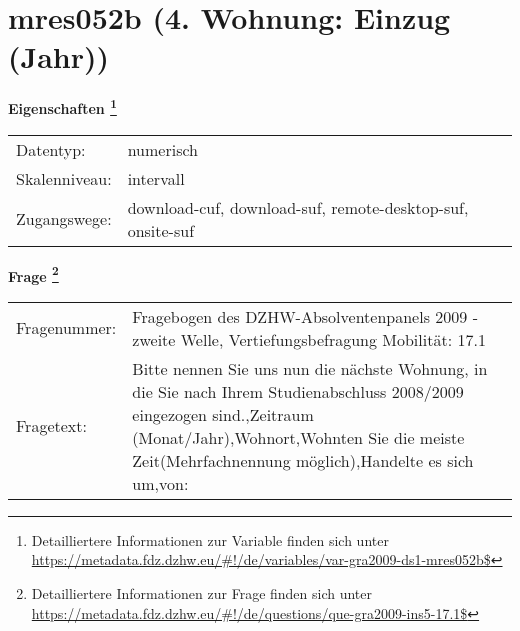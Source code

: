 
    \setcounter{footnote}{0}

    \vspace*{-1.8cm}
	\section{mres052b (4. Wohnung: Einzug (Jahr))}
	\label{section:mres052b}



    \vspace*{0.5cm}
    \noindent\textbf{Eigenschaften
	\footnote{Detailliertere Informationen zur Variable finden sich unter
		\url{https://metadata.fdz.dzhw.eu/\#!/de/variables/var-gra2009-ds1-mres052b$}}}\\
	\begin{tabularx}{\hsize}{@{}lX}
	Datentyp: & numerisch \\
	Skalenniveau: & intervall \\
	Zugangswege: &
	  download-cuf, 
	  download-suf, 
	  remote-desktop-suf, 
	  onsite-suf
 \\
    \end{tabularx}



				\vspace*{0.5cm}
                \noindent\textbf{Frage
	                \footnote{Detailliertere Informationen zur Frage finden sich unter
		              \url{https://metadata.fdz.dzhw.eu/\#!/de/questions/que-gra2009-ins5-17.1$}}}\\
				\begin{tabularx}{\hsize}{@{}lX}
					Fragenummer: &
					  Fragebogen des DZHW-Absolventenpanels 2009 - zweite Welle, Vertiefungsbefragung Mobilität:
					  17.1
 \\
					Fragetext: & Bitte nennen Sie uns nun die nächste Wohnung, in die Sie nach Ihrem Studienabschluss 2008/2009 eingezogen sind.,Zeitraum (Monat/Jahr),Wohnort,Wohnten Sie die meiste Zeit(Mehrfachnennung möglich),Handelte es sich um,von: \\
				\end{tabularx}





